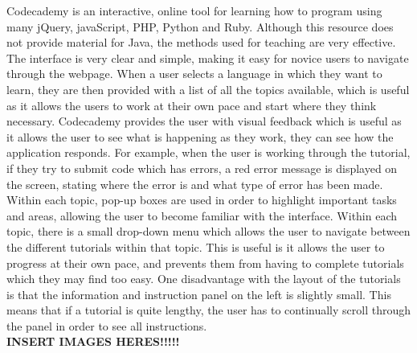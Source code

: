 \documentclass{article}
\begin{document}
Codecademy is an interactive, online tool for learning how to program using many jQuery, javaScript, PHP, Python and Ruby. Although this resource does not provide material for Java, the methods used for teaching are very effective. The interface is very clear and simple, making it easy for novice users to navigate through the webpage. When a user selects a language in which they want to learn, they are then provided with a list of all the topics available, which is useful as it allows the users to work at their own pace and start where they think necessary. Codecademy provides the user with visual feedback which is useful as it allows the user to see what is happening as they work, they can see how the application responds. For example, when the user is working through the tutorial, if they try to submit code which has errors, a red error message is displayed on the screen, stating where the error is and what type of error has been made. Within each topic, pop-up boxes are used in order to highlight important tasks and areas, allowing the user to become familiar with the interface. Within each topic, there is a small drop-down menu which allows the user to navigate between the different tutorials within that topic. This is useful is it allows the user to progress at their own pace, and prevents them from having to complete tutorials which they may find too easy. One disadvantage with the layout of the tutorials is that the information and instruction panel on the left is slightly small. This means that if a tutorial is quite lengthy, the user has to continually scroll through the panel in order to see all instructions.\\

\textbf{INSERT IMAGES HERES!!!!!}\\
\end{document}
